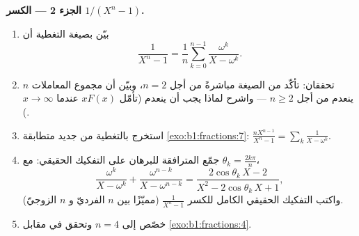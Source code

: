 \begin{problem}
\medskip
\noindent\textbf{الجزء 2 --- الكسر $1/(X^n - 1)$.}
\begin{enumerate}[resume]
  \item بيّن بصيغة التغطية أن
        \[
        \frac{1}{X^n - 1}
        = \frac1n\sum_{k=0}^{n-1}\frac{\omega^k}{X - \omega^k} .
        \]
  \item تحققان: تأكّد من الصيغة مباشرةً من أجل $n =
        2$، وبيّن أن مجموع المعاملات $n$
        ينعدم من أجل $n \geq 2$ --- واشرح لماذا يجب أن ينعدم (تأمّل
        $xF(x)$ عندما $x \to \infty$).
  \item استخرج بالتغطية من جديد متطابقة
        \cref{exo:b1:fractions:7}:
        $\frac{nX^{n-1}}{X^n-1} = \sum_k \frac1{X - \omega^k}$.
  \item جمّع  المترافقة للبرهان على التفكيك الحقيقي:
        مع $\theta_k = \frac{2k\pi}n$،
        \[
        \frac{\omega^k}{X - \omega^k} +
        \frac{\omega^{n-k}}{X - \omega^{n-k}}
        = \frac{2\cos\theta_k\,X - 2}
        {X^2 - 2\cos\theta_k\,X + 1} ,
        \]
        واكتب التفكيك الحقيقي الكامل للكسر
        $\frac1{X^n-1}$ (مميّزًا بين $n$ الفرديّ و $n$ الزوجيّ).
  \item خصّص إلى $n = 4$ وتحقق في مقابل
        \cref{exo:b1:fractions:4}.
\end{enumerate}


\end{problem}
